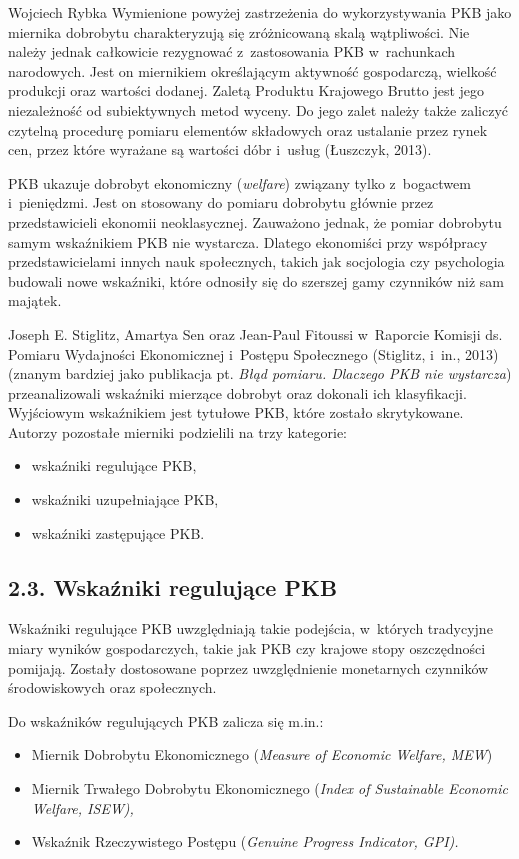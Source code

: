 \begin{artplenv}{Wojciech Rybka}
Wymienione powyżej zastrzeżenia do wykorzystywania PKB jako miernika dobrobytu charakteryzują się zróżnicowaną skalą
wątpliwości. Nie należy jednak całkowicie rezygnować z~zastosowania PKB w~rachunkach narodowych. Jest on miernikiem
określającym aktywność gospodarczą, wielkość produkcji oraz wartości dodanej. Zaletą Produktu Krajowego Brutto jest
jego niezależność od subiektywnych metod wyceny. Do jego zalet należy także zaliczyć czytelną procedurę pomiaru
elementów składowych oraz ustalanie przez rynek cen, przez które wyrażane są wartości dóbr i~usług
\label{ref:RNDSSK4v1vUty}(Łuszczyk, 2013).

PKB ukazuje dobrobyt ekonomiczny (\textit{welfare}) związany tylko z~bogactwem i~pieniędzmi. Jest on stosowany do
pomiaru dobrobytu głównie przez przedstawicieli ekonomii neoklasycznej. Zauważono jednak, że pomiar dobrobytu samym
wskaźnikiem PKB nie wystarcza. Dlatego ekonomiści przy współpracy przedstawicielami innych nauk społecznych, takich jak
socjologia czy psychologia budowali nowe wskaźniki, które odnosiły się do szerszej gamy czynników niż sam majątek. 

Joseph E. Stiglitz, Amartya Sen oraz Jean-Paul Fitoussi w~Raporcie Komisji ds. Pomiaru Wydajności Ekonomicznej i~Postępu
Społecznego \label{ref:RNDC16yhBNNvp}(Stiglitz, i~in., 2013) (znanym bardziej jako publikacja pt. \textit{Błąd pomiaru.
Dlaczego PKB nie wystarcza}) przeanalizowali wskaźniki mierzące dobrobyt oraz dokonali ich klasyfikacji. Wyjściowym
wskaźnikiem jest tytułowe PKB, które zostało skrytykowane. Autorzy pozostałe mierniki podzielili na trzy kategorie:

\begin{itemize}
\item wskaźniki regulujące PKB,
\item wskaźniki uzupełniające PKB,
\item wskaźniki zastępujące PKB. 
\end{itemize}
\subsection{2.3. Wskaźniki regulujące PKB}
Wskaźniki regulujące PKB uwzględniają takie podejścia, w~których tradycyjne miary wyników gospodarczych, takie jak PKB
czy krajowe stopy oszczędności pomijają. Zostały dostosowane poprzez uwzględnienie monetarnych czynników środowiskowych
oraz społecznych.

Do wskaźników regulujących PKB zalicza się m.in.:

\begin{itemize}
\item Miernik Dobrobytu Ekonomicznego (\textit{Measure of Economic Welfare, MEW})
\item Miernik Trwałego Dobrobytu Ekonomicznego (\textit{Index of Sustainable Economic Welfare, ISEW),}
\item Wskaźnik Rzeczywistego Postępu (\textit{Genuine Progress Indicator, GPI).}
\end{itemize}


\end{artplenv}
